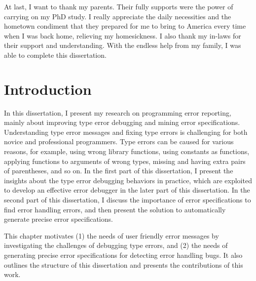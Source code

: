 \documentclass[12pt]{report}	%
\begin{document}
\begin{acknowledgments}
At last, I want to thank my parents.
Their fully supports were the power of carrying on my PhD study.
I really appreciate the daily necessities and the hometown condiment
that they prepared for me to bring to America every time when I was back home,
relieving my homesickness.
I also thank my in-laws for their support and understanding.
With the endless help from my family, I was able to complete this dissertation.


\end{acknowledgments}

\tableofcontents   
\listoffigures     

%
%
%
%

\chapter{Introduction}

In this dissertation, I present my research on programming error reporting, 
mainly about improving type error debugging and mining error specifications.
Understanding type error messages and fixing type errors is challenging for both novice and professional programmers.
Type errors can be caused for various reasons, for example, 
using wrong library functions,
using constants as functions, 
applying functions to arguments of wrong types, 
missing and having extra pairs of parentheses, and so on. 
In the first part of this dissertation, I present the insights about the type error debugging behaviors in practice, 
which are exploited to develop an effective error debugger in the later part of this dissertation.
%
In the second part of this dissertation, I discuss the importance of error specifications to find error handling errors,
and then present the solution to automatically generate precise error specifications.

This chapter motivates (1) the needs of user friendly error messages
by investigating the challenges of debugging type errors,
and (2) the needs of generating precise error specifications for detecting error handling bugs.
It also outlines the structure of this dissertation and presents the contributions of this work.
\end{document}
